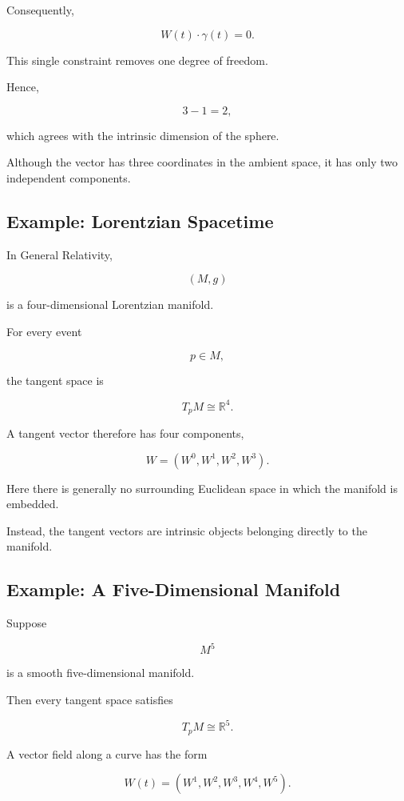 \documentclass[12pt,a4paper]{article}
\theoremstyle{notespace}
\begin{document}
Consequently,

\[
\boxed{
	W(t)\cdot\gamma(t)=0.
}
\]

This single constraint removes one degree of freedom.

Hence,

\[
3-1=2,
\]

which agrees with the intrinsic dimension of the sphere.

Although the vector has three coordinates in the ambient space, it has
only two independent components.


\subsection{Example: Lorentzian Spacetime}

In General Relativity,

\[
(M,g)
\]

is a four-dimensional Lorentzian manifold.

For every event

\[
p\in M,
\]

the tangent space is

\[
T_pM\cong\mathbb{R}^4.
\]

A tangent vector therefore has four components,

\[
\boxed{
	W
	=
	(W^0,W^1,W^2,W^3).
}
\]

Here there is generally no surrounding Euclidean space in which the
manifold is embedded.

Instead, the tangent vectors are intrinsic objects belonging directly to
the manifold.


\subsection{Example: A Five-Dimensional Manifold}

Suppose

\[
M^5
\]

is a smooth five-dimensional manifold.

Then every tangent space satisfies

\[
\boxed{
	T_pM\cong\mathbb{R}^5.
}
\]

A vector field along a curve has the form

\[
\boxed{
	W(t)
	=
	(W^1,W^2,W^3,W^4,W^5).
}
\]
\end{document}

